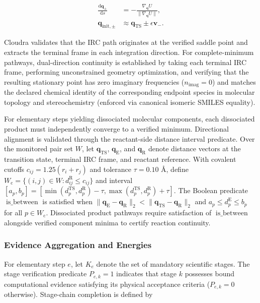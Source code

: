 \begin{equation}\label{eq:methods-12}
\begin{aligned}
\frac{\mathrm{d}\mathbf{q}_{\pm}}{\mathrm{d}s}&=-\frac{\nabla_{\mathbf{q}}U}{\|\nabla_{\mathbf{q}}U\|},\\
\mathbf{q}_{\mathrm{init},\pm}&\approx\mathbf{q}_{\mathrm{TS}}\pm\epsilon\mathbf{v}_-.
\end{aligned}
\end{equation}

Cloudra validates that the IRC path originates at the verified saddle point and extracts the terminal frame in each integration direction. For complete-minimum pathways, dual-direction continuity is established by taking each terminal IRC frame, performing unconstrained geometry optimization, and verifying that the resulting stationary point has zero imaginary frequencies ($n_{\mathrm{imag}}=0$) and matches the declared chemical identity of the corresponding endpoint species in molecular topology and stereochemistry (enforced via canonical isomeric SMILES equality).

For elementary steps yielding dissociated molecular components, each dissociated product must independently converge to a verified minimum. Directional alignment is validated through the reactant-side distance interval predicate. Over the monitored pair set $W$, let $\mathbf{q}_{\mathrm{TS}}$, $\mathbf{q}_{\mathrm{E}}$, and $\mathbf{q}_{\mathrm{R}}$ denote distance vectors at the transition state, terminal IRC frame, and reactant reference. With covalent cutoffs $c_{ij}=1.25(r_i+r_j)$ and tolerance $\tau=0.10$ Å, define $W_{\mathrm{c}}=\{(i,j)\in W:d_{ij}^{\mathrm{R}}\le c_{ij}\}$ and interval $[a_p,b_p]=[\min(d_p^{\mathrm{TS}},d_p^{\mathrm{R}})-\tau, \max(d_p^{\mathrm{TS}},d_p^{\mathrm{R}})+\tau]$. The Boolean predicate $\operatorname{is\_between}$ is satisfied when $\|\mathbf{q}_{\mathrm{E}}-\mathbf{q}_{\mathrm{R}}\|_2<\|\mathbf{q}_{\mathrm{TS}}-\mathbf{q}_{\mathrm{R}}\|_2$ and $a_p\le d_p^{\mathrm{E}}\le b_p$ for all $p\in W_{\mathrm{c}}$. Dissociated product pathways require satisfaction of $\operatorname{is\_between}$ alongside verified component minima to certify reaction continuity.

\subsubsection{Evidence Aggregation and Energies}
For elementary step $e$, let $K_e$ denote the set of mandatory scientific stages. The stage verification predicate $P_{e,k}=1$ indicates that stage $k$ possesses bound computational evidence satisfying its physical acceptance criteria ($P_{e,k}=0$ otherwise). Stage-chain completion is defined by

